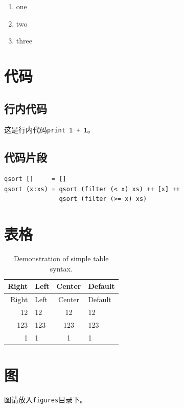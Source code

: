 \documentclass[titlepage,openany]{SHUugt}
\begin{document}
\begin{enumerate}
\def\labelenumi{\arabic{enumi}.}
\tightlist
\item
  one
\item
  two
\item
  three
\end{enumerate}

\section{代码}\label{ux4ee3ux7801}

\subsection{行内代码}\label{ux884cux5185ux4ee3ux7801}

这是行内代码\texttt{print\ 1\ +\ 1}。

\subsection{代码片段}\label{ux4ee3ux7801ux7247ux6bb5}

\begin{verbatim}
qsort []     = []
qsort (x:xs) = qsort (filter (< x) xs) ++ [x] ++
               qsort (filter (>= x) xs)
\end{verbatim}

\section{表格}\label{ux8868ux683c}

\begin{longtable}[]{@{}rlcl@{}}
\caption{Demonstration of simple table
syntax\label{table:simple}.}\tabularnewline
\toprule
Right & Left & Center & Default\tabularnewline
\midrule
\endfirsthead
\toprule
Right & Left & Center & Default\tabularnewline
\midrule
\endhead
12 & 12 & 12 & 12\tabularnewline
123 & 123 & 123 & 123\tabularnewline
1 & 1 & 1 & 1\tabularnewline
\bottomrule
\end{longtable}

\section{图}\label{ux56fe}

图请放入\texttt{figures}目录下。
\end{document}
